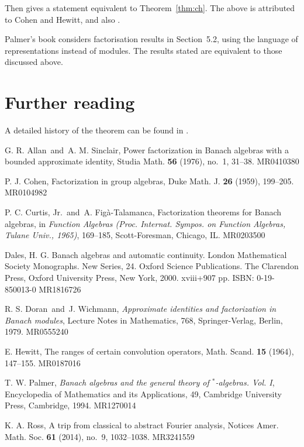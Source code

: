 \documentclass[a4paper,11pt]{article}
\theoremstyle{definition}
\begin{document}
Then \cite[Corollary~2.9.26]{dales} gives a statement equivalent to Theorem~\ref{thm:ch}.
The above is attributed to Cohen and Hewitt, and also \cite{as}.

Palmer's book \cite{palmer} considers factorisation results in Section~5.2, using the
language of representations instead of modules.  The results stated are equivalent to those
discussed above.


\section{Further reading}

A detailed history of the theorem can be found in \cite[pages~1033-34]{ross}.


\begin{thebibliography}{99}

 G. R. Allan\ and\ A. M. Sinclair, Power factorization in Banach algebras with a bounded approximate identity, Studia Math. {\bf 56} (1976), no.~1, 31--38. MR0410380

 P. J. Cohen, Factorization in group algebras, Duke Math. J. {\bf 26} (1959), 199--205. MR0104982

 P. C. Curtis, Jr.\ and\ A. Fig\`a-Talamanca, Factorization theorems for Banach algebras, in {\it Function Algebras (Proc. Internat. Sympos. on Function Algebras, Tulane Univ., 1965)}, 169--185, Scott-Foresman, Chicago, IL. MR0203500

 Dales, H. G. Banach algebras and automatic continuity. London Mathematical Society Monographs. New Series, 24. Oxford Science Publications. The Clarendon Press, Oxford University Press, New York, 2000. xviii+907 pp. ISBN: 0-19-850013-0 MR1816726

 R. S. Doran\ and\ J. Wichmann, {\it Approximate identities and factorization in Banach modules}, Lecture Notes in Mathematics, 768, Springer-Verlag, Berlin, 1979. MR0555240

 E. Hewitt, The ranges of certain convolution operators, Math. Scand. {\bf 15} (1964), 147--155. MR0187016

 T. W. Palmer, {\it Banach algebras and the general theory of $^*$-algebras. Vol. I}, Encyclopedia of Mathematics and its Applications, 49, Cambridge University Press, Cambridge, 1994. MR1270014

 K. A. Ross, A trip from classical to abstract Fourier analysis, Notices Amer. Math. Soc. {\bf 61} (2014), no.~9, 1032--1038. MR3241559

\end{thebibliography}
\end{document}
